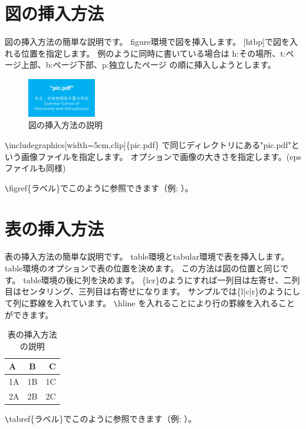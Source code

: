 \documentclass[a4paper,10pt,oneside,twocolumn,notitlepage,final]{jarticle}
\begin{document}
\section{図の挿入方法}
図の挿入方法の簡単な説明です。
figure環境で図を挿入します。
[htbp]で図を入れる位置を指定します。
例のように同時に書いている場合は
h:その場所、t:ページ上部、b:ページ下部、p:独立したページ
の順に挿入しようとします。


\begin{figure}[htbp]
 \centering
 \includegraphics[width=3cm,clip]{pic.pdf}
 \caption{図の挿入方法の説明}
 \label{pic} %
\end{figure}

\verb+\+includegraphics[width=5cm,clip]\{pic.pdf\}
で同じディレクトリにある"pic.pdf"という画像ファイルを指定します。
オプションで画像の大きさを指定します。(epsファイルも同様)

\verb+\+figref\{ラベル\}でこのように参照できます（例: ）。

\section{表の挿入方法}
表の挿入方法の簡単な説明です。
table環境とtabular環境で表を挿入します。
table環境のオプションで表の位置を決めます。
この方法は図の位置と同じです。
table環境の後に列を決めます。
\{lcr\}のようにすれば一列目は左寄せ、二列目はセンタリング、三列目は右寄せになります。
サンプルでは\{l|c|r\}のようにして列に罫線を入れています。
\verb+\+hline を入れることにより行の罫線を入れることができます。

\begin{table}[htb]
 \caption{表の挿入方法の説明}
  \centering
   \begin{tabular}{|l|c|r|} \hline
     A & B & C  \\ \hline
     1A & 1B & 1C  \\
     2A & 2B & 2C  \\ \hline
   \end{tabular}
  \label{table}%
\end{table}

\verb+\+tabref\{ラベル\}でこのように参照できます（例: ）。
\end{document}
